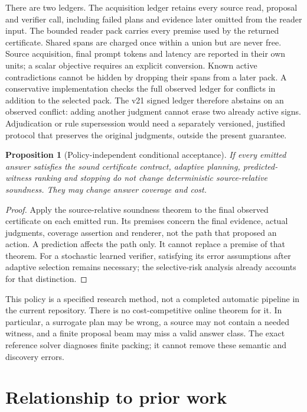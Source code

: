 \documentclass[11pt]{article}
\newtheorem{proposition}[theorem]{Proposition}
\theoremstyle{definition}
\theoremstyle{remark}
\begin{document}
There are two ledgers. The acquisition ledger retains every source read,
proposal and verifier call, including failed plans and evidence later omitted
from the reader input. The bounded reader pack carries every premise used by
the returned certificate. Shared spans are charged once within a union but
are never free. Source acquisition, final prompt tokens and latency are
reported in their own units; a scalar objective requires an explicit conversion.
Known active contradictions cannot be hidden by dropping their spans from a
later pack. A conservative implementation checks the full observed ledger for
conflicts in addition to the selected pack. The v21 signed ledger therefore
abstains on an observed conflict: adding another judgment cannot erase two
already active signs. Adjudication or rule supersession would need a separately
versioned, justified protocol that preserves the original judgments, outside
the present guarantee.

\begin{proposition}[Policy-independent conditional acceptance]
If every emitted answer satisfies the sound certificate contract, adaptive
planning, predicted-witness ranking and stopping do not change deterministic
source-relative soundness. They may change answer coverage and cost.
\end{proposition}
\begin{proof}
Apply the source-relative soundness theorem to the final observed certificate
on each emitted run. Its premises concern the final evidence, actual judgments,
coverage assertion and renderer, not the path that proposed an action. A
prediction affects the path only. It cannot replace a premise of that theorem.
For a stochastic learned verifier, satisfying its error assumptions after
adaptive selection remains necessary; the selective-risk analysis already
accounts for that distinction.
\end{proof}

This policy is a specified research method, not a completed automatic pipeline
in the current repository. There is no cost-competitive online theorem for
it. In particular, a surrogate plan may be wrong, a source may not contain a
needed witness, and a finite proposal beam may miss a valid answer class.
The exact reference solver diagnoses finite packing; it cannot remove these
semantic and discovery errors.

\section{Relationship to prior work}
\label{sec:related}

\end{document}
